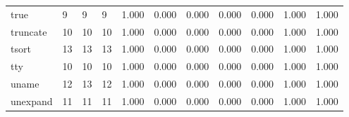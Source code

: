 \begin{longtable}{lp{1.2cm}p{1.2cm}p{1.2cm}p{1.2cm}p{1.2cm}p{1.2cm}p{1.2cm}p{1.2cm}p{1.2cm}p{1.2cm}}
true      &                            9 &                  9 &                                 9 &                                      1.000 &                                  0.000 &                                        0.000 &                             0.000 &                                   0.000 &                              1.000 &                                              1.000 \\
truncate  &                           10 &                 10 &                                10 &                                      1.000 &                                  0.000 &                                        0.000 &                             0.000 &                                   0.000 &                              1.000 &                                              1.000 \\
tsort     &                           13 &                 13 &                                13 &                                      1.000 &                                  0.000 &                                        0.000 &                             0.000 &                                   0.000 &                              1.000 &                                              1.000 \\
tty       &                           10 &                 10 &                                10 &                                      1.000 &                                  0.000 &                                        0.000 &                             0.000 &                                   0.000 &                              1.000 &                                              1.000 \\
uname     &                           12 &                 13 &                                12 &                                      1.000 &                                  0.000 &                                        0.000 &                             0.000 &                                   0.000 &                              1.000 &                                              1.000 \\
unexpand  &                           11 &                 11 &                                11 &                                      1.000 &                                  0.000 &                                        0.000 &                             0.000 &                                   0.000 &                              1.000 &                                              1.000 \\

\end{longtable}
